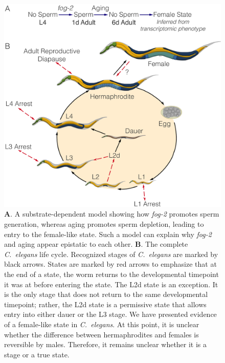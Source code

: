 \documentclass[9pt,twocolumn,twoside]{gsag3jnl}
\newcommand{\cel}{\emph{C.~elegans}}
\newcommand{\gene}[1]{\emph{\mbox{#1}}}
\begin{document}
\begin{figure}
  \renewcommand{\familydefault}{\sfdefault}\normalfont{}
  \centering
  \includegraphics[width=\linewidth]{../../output/figs/final_figs/c_elegans_life_cycle.pdf}
  \caption{
    \textbf{A}. A substrate-dependent model showing how \gene{fog-2} promotes sperm
    generation, whereas aging promotes sperm depletion, leading to entry to the
    female-like state. Such a model can explain why \gene{fog-2} and aging appear
    epistatic to each other.
    \textbf{B}. The complete \cel{} life cycle.
    Recognized stages of \cel{} are marked by black arrows. States are marked by
    red arrows to emphasize that at the end of a state, the worm returns to the
    developmental timepoint it was at before entering the state. The L2d state
    is an exception. It is the only stage that does not return to the same
    developmental timepoint; rather, the L2d state is a permissive state that
    allows entry into either dauer or the L3 stage. We have presented evidence
    of a female-like state in \cel{}. At this point, it is unclear whether the
    difference between hermaphrodites and females is reversible by males.
    Therefore, it remains unclear whether it is a stage or a true state.
  }%
\label{fig:lifecycle}
\end{figure}
\end{document}
